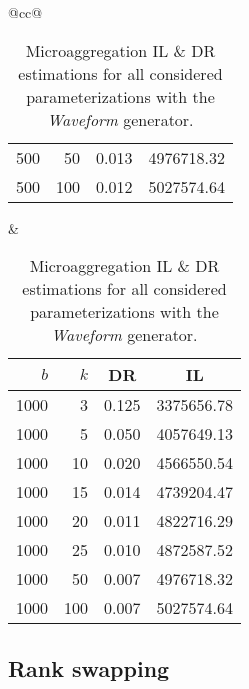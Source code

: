 \begin{table}[H]
\begin{tabular}{@{}cc@{}}
\begin{tabular}{@{}rrrr@{}}
			500  & 50  & 0.013 & 4976718.32 \\
			500  & 100 & 0.012 & 5027574.64 \\ \bottomrule
		\end{tabular}
		&
		\begin{tabular}{@{}rrrr@{}}
			\toprule
			$b$ & $k$ & \multicolumn{1}{c}{DR} & \multicolumn{1}{c}{IL} \\ \midrule
			1000 & 3   & 0.125 & 3375656.78 \\
			1000 & 5   & 0.050 & 4057649.13 \\
			1000 & 10  & 0.020 & 4566550.54 \\
			1000 & 15  & 0.014 & 4739204.47 \\
			1000 & 20  & 0.011 & 4822716.29 \\
			1000 & 25  & 0.010 & 4872587.52 \\
			1000 & 50  & 0.007 & 4976718.32 \\
			1000 & 100 & 0.007 & 5027574.64 \\ \bottomrule
		\end{tabular}
	\end{tabular}
	\caption[Microaggregation DR \& IL estimations (Waveform).]{Microaggregation IL \& DR estimations for all considered parameterizations with the \textit{Waveform} generator.}
	\label{table:results-wave-microaggregation}
\end{table}

\subsection{Rank swapping}
\label{Benchmarking:Results:RankSwap}

